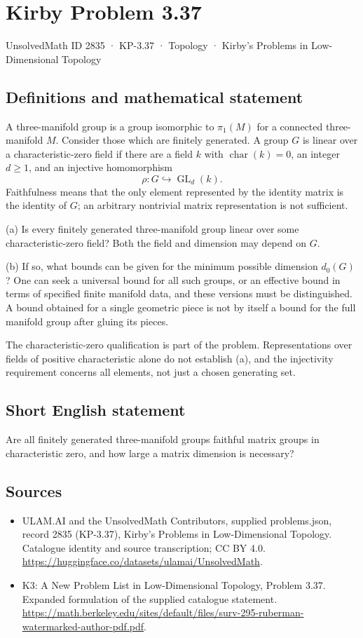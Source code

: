 \documentclass[11pt,a4paper]{article}
\begin{document}
\section*{Kirby Problem 3.37}\label{2835}
{\small UnsolvedMath ID 2835 · KP-3.37 · Topology · Kirby's Problems in Low-Dimensional Topology}
\subsection{Definitions and mathematical statement}
A three-manifold group is a group isomorphic to $\pi_1(M)$ for a connected
three-manifold $M$. Consider those which are finitely generated. A group
$G$ is linear over a characteristic-zero field if there are a field $k$
with $\operatorname{char}(k)=0$, an integer $d\geq1$, and an injective
homomorphism
\[
 \rho:G\hookrightarrow\operatorname{GL}_d(k).
\]
Faithfulness means that the only element represented by the identity matrix
is the identity of $G$; an arbitrary nontrivial matrix representation is
not sufficient.

(a) Is every finitely generated three-manifold group linear over some
characteristic-zero field? Both the field and dimension may depend on $G$.

(b) If so, what bounds can be given for the minimum possible dimension
$d_0(G)$? One can seek a universal bound for all such groups, or an effective
bound in terms of specified finite manifold data, and these versions must
be distinguished. A bound obtained for a single geometric piece is not by
itself a bound for the full manifold group after gluing its pieces.

The characteristic-zero qualification is part of the problem. Representations
over fields of positive characteristic alone do not establish (a), and the
injectivity requirement concerns all elements, not just a chosen generating set.
\subsection{Short English statement}
Are all finitely generated three-manifold groups faithful matrix groups in characteristic zero, and how large a matrix dimension is necessary?
\subsection{Sources}
\begin{itemize}
\item[S1] ULAM.AI and the UnsolvedMath Contributors, supplied problems.json, record 2835 (KP-3.37), Kirby's Problems in Low-Dimensional Topology. Catalogue identity and source transcription; CC BY 4.0.
\url{https://huggingface.co/datasets/ulamai/UnsolvedMath}.
\item[S2] K3: A New Problem List in Low-Dimensional Topology, Problem 3.37. Expanded formulation of the supplied catalogue statement.
\url{https://math.berkeley.edu/sites/default/files/surv-295-ruberman-watermarked-author-pdf.pdf}.
\end{itemize}
\end{document}
